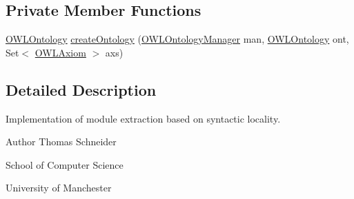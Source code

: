 \subsection*{Private Member Functions}
\begin{DoxyCompactItemize}
\item 
\hyperlink{interfaceorg_1_1semanticweb_1_1owlapi_1_1model_1_1_o_w_l_ontology}{O\-W\-L\-Ontology} \hyperlink{classuk_1_1ac_1_1manchester_1_1cs_1_1owlapi_1_1modularity_1_1_syntactic_locality_module_extractor_ae75c99322c75630f8bf4f201d5f8bd47}{create\-Ontology} (\hyperlink{interfaceorg_1_1semanticweb_1_1owlapi_1_1model_1_1_o_w_l_ontology_manager}{O\-W\-L\-Ontology\-Manager} man, \hyperlink{interfaceorg_1_1semanticweb_1_1owlapi_1_1model_1_1_o_w_l_ontology}{O\-W\-L\-Ontology} ont, Set$<$ \hyperlink{interfaceorg_1_1semanticweb_1_1owlapi_1_1model_1_1_o_w_l_axiom}{O\-W\-L\-Axiom} $>$ axs)
\end{DoxyCompactItemize}


\subsection{Detailed Description}
Implementation of module extraction based on syntactic locality.

\begin{DoxyAuthor}{Author}
Thomas Schneider 

School of Computer Science 

University of Manchester 
\end{DoxyAuthor}


